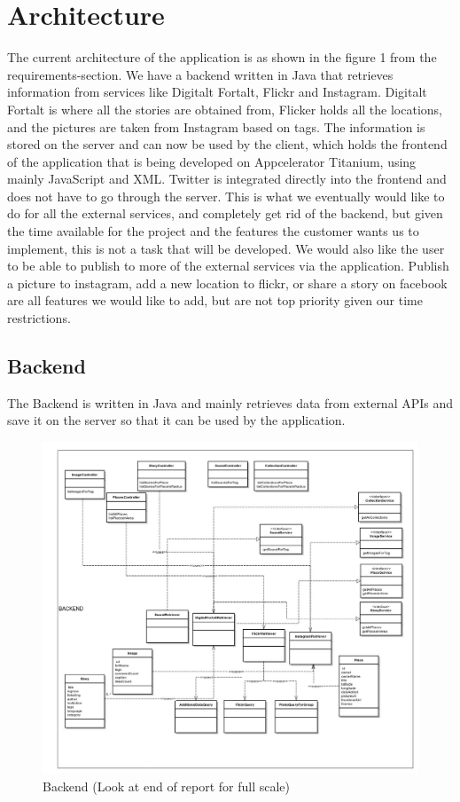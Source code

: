\section{Architecture}
\thispagestyle{plain}

The current architecture of the application is as shown in the figure 1 from the requirements-section. We have a backend written in Java that retrieves information from services like Digitalt Fortalt, Flickr and Instagram. Digitalt Fortalt is where all the stories are obtained from, Flicker holds all the locations, and the pictures are taken from Instagram based on tags. The information is stored on the server and can now be used by the client, which holds the frontend of the application that is being developed on Appcelerator Titanium, using mainly JavaScript and XML. Twitter is integrated directly into the frontend and does not have to go through the server. This is what we eventually would like to do for all the external services, and completely get rid of the backend, but given the time available for the project and the features the customer wants us to implement, this is not a task that will be developed. We would also like the user to be able to publish to more of the external services via the application. Publish a picture to instagram, add a new location to flickr, or share a story on facebook are all features we would like to add, but are not top priority given our time restrictions.

\subsection{Backend}
The Backend is written in Java and mainly retrieves data from external APIs and save it on the server so that it can be used by the application.

\begin{figure}[!h]
\begin{center}
\includegraphics[scale=0.1]{class-backend.jpg}
\caption{Backend (Look at end of report for full scale) }
\end{center}
\end{figure}

